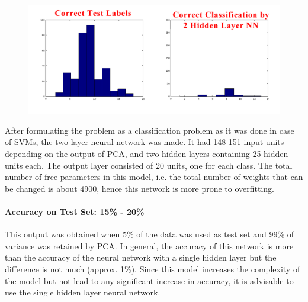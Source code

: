 \documentclass[12pt]{article}
\begin{document}
	\begin{figure}[h]
	\includegraphics[width=\textwidth]{CorrectVsNN2}
	\end{figure}
	
	After formulating the problem as a classification problem as it was
	done in case of SVMs, the two layer neural network was made. It
	had 148-151 input units depending on the output of PCA, and two 
	hidden layers containing 25 hidden units each. The output layer
	consisted of 20 units, one for each class. The total number of free
	parameters in this model, i.e. the total number of weights that can
	be changed is about 4900, hence this network is more prone to 
	overfitting.
	
	\paragraph{Accuracy on Test Set: 15\% - 20\%\newline}
	
	This output was obtained when 5\% of the data was used as test set and
	99\% of variance was retained by PCA.
	In general, the accuracy of this network is more than the accuracy of 
	the neural network with a single hidden layer but the difference is not
	much (approx. 1\%). Since this model increases the complexity of the
	model but not lead to any significant increase in accuracy, it is advisable
	to use the single hidden layer neural network.
	
	
\end{document}
